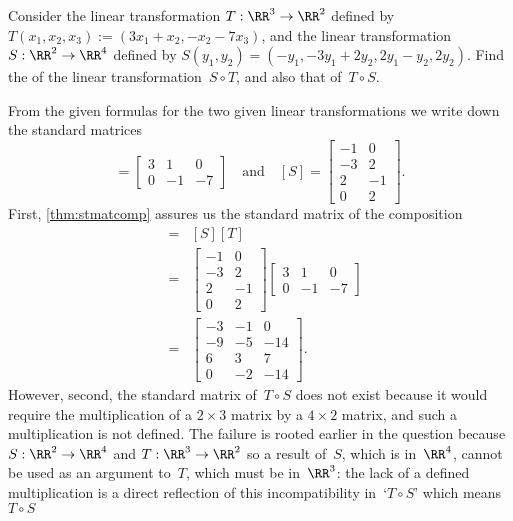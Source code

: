 \begin{example} 
Consider the linear transformation \(T:\RR^3\to\RR^2\) defined by \(T(x_1,x_2,x_3):=(3x_1+x_2,-x_2-7x_3)\), and the linear transformation \(S:\RR^2\to\RR^4\) defined by \(S(y_1,y_2)=(-y_1, -3y_1+2y_2, 2y_1-y_2, 2y_2)\).
Find the  of the linear transformation~\(S\circ T\), and also that of~\(T\circ S\).
\begin{solution} 
From the given formulas for the two given linear transformations we write down the standard matrices
\begin{equation*}
[T]=\begin{bmatrix}3&1&0\\0&-1&-7  \end{bmatrix}
\quad\text{and}\quad
[S]=\begin{bmatrix} -1&0\\ -3&2\\2&-1\\0&2 \end{bmatrix}.
\end{equation*}
First, \cref{thm:stmatcomp} assures us the standard matrix of the composition
\begin{eqnarray*}
[S\circ T]&=&[S][T]
\\&=&\begin{bmatrix} -1&0\\ -3&2\\2&-1\\0&2 \end{bmatrix}
\begin{bmatrix}3&1&0\\0&-1&-7  \end{bmatrix}
\\&=&\begin{bmatrix}-3&-1&0
\\-9&-5&-14
\\6&3&7
\\0&-2&-14 \end{bmatrix}.
\end{eqnarray*}
However, second, the standard matrix of~\(T\circ S\) does not exist because it would require the multiplication of a \(2\times3\) matrix by a \(4\times 2\) matrix, and such a multiplication is not defined.
The failure is rooted earlier in the question because \(S:\RR^2\to\RR^4\) and \(T:\RR^3\to\RR^2\) so a result of~\(S\), which is in~\(\RR^4\), cannot be used as an argument to~\(T\), which must be in~\(\RR^3\): the lack of a defined multiplication is a direct reflection of this incompatibility in~`\(T\circ S\)' which means \(T\circ S\) 
\end{solution}
\end{example}




